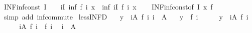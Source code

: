 \begin{isabellebody}
\endisatagproof
{\isafoldproof}%
%
\isadelimproof
\isanewline
%
\endisadelimproof
\isanewline
{}\isamarkupfalse%
\ INF{\isacharunderscore}{\kern0pt}inf{\isacharunderscore}{\kern0pt}const{}{\isacharcolon}{\kern0pt}\ {\isachardoublequoteopen}I\ {\isasymnoteq}\ {\isacharbraceleft}{\kern0pt}{\isacharbraceright}{\kern0pt}\ {\isasymLongrightarrow}\ {\isacharparenleft}{\kern0pt}{\isasymSqinter}i{\isasymin}I{\isachardot}{\kern0pt}\ inf\ {\isacharparenleft}{\kern0pt}f\ i{\isacharparenright}{\kern0pt}\ x{\isacharparenright}{\kern0pt}\ {\isacharequal}{\kern0pt}\ inf\ {\isacharparenleft}{\kern0pt}{\isasymSqinter}i{\isasymin}I{\isachardot}{\kern0pt}\ f\ i{\isacharparenright}{\kern0pt}\ x{\isachardoublequoteclose}\isanewline
%
\isadelimproof
\ \ %
\endisadelimproof
%
\isatagproof
{}\isamarkupfalse%
\ INF{\isacharunderscore}{\kern0pt}inf{\isacharunderscore}{\kern0pt}const{}{\isacharbrackleft}{\kern0pt}of\ I\ x\ f{\isacharbrackright}{\kern0pt}\ \isamarkupfalse%
\ {\isacharparenleft}{\kern0pt}simp\ add{\isacharcolon}{\kern0pt}\ inf{\isacharunderscore}{\kern0pt}commute{\isacharparenright}{\kern0pt}%
\endisatagproof
{\isafoldproof}%
%
\isadelimproof
\isanewline
%
\endisadelimproof
\isanewline
{}\isamarkupfalse%
\ less{\isacharunderscore}{\kern0pt}INF{\isacharunderscore}{\kern0pt}D{\isacharcolon}{\kern0pt}\isanewline
\ \ \ {\isachardoublequoteopen}y\ {\isacharless}{\kern0pt}\ {\isacharparenleft}{\kern0pt}{\isasymSqinter}i{\isasymin}A{\isachardot}{\kern0pt}\ f\ i{\isacharparenright}{\kern0pt}{\isachardoublequoteclose}\ {\isachardoublequoteopen}i\ {\isasymin}\ A{\isachardoublequoteclose}\isanewline
\ \ \ {\isachardoublequoteopen}y\ {\isacharless}{\kern0pt}\ f\ i{\isachardoublequoteclose}\isanewline
%
\isadelimproof
%
\endisadelimproof
%
\isatagproof
{}\isamarkupfalse%
\ {\isacharminus}{\kern0pt}\isanewline
\ \ \isamarkupfalse%
\ {\isacartoucheopen}y\ {\isacharless}{\kern0pt}\ {\isacharparenleft}{\kern0pt}{\isasymSqinter}i{\isasymin}A{\isachardot}{\kern0pt}\ f\ i{\isacharparenright}{\kern0pt}{\isacartoucheclose}\isanewline
\ \ \isamarkupfalse%
\ \isamarkupfalse%
\ {\isachardoublequoteopen}{\isacharparenleft}{\kern0pt}{\isasymSqinter}i{\isasymin}A{\isachardot}{\kern0pt}\ f\ i{\isacharparenright}{\kern0pt}\ {\isasymle}\ f\ i{\isachardoublequoteclose}\ \isamarkupfalse%
\ {\isacartoucheopen}i\ {\isasymin}\ A{\isacartoucheclose}\isanewline
\ \ \ \ \isamarkupfalse%

\end{isabellebody}
